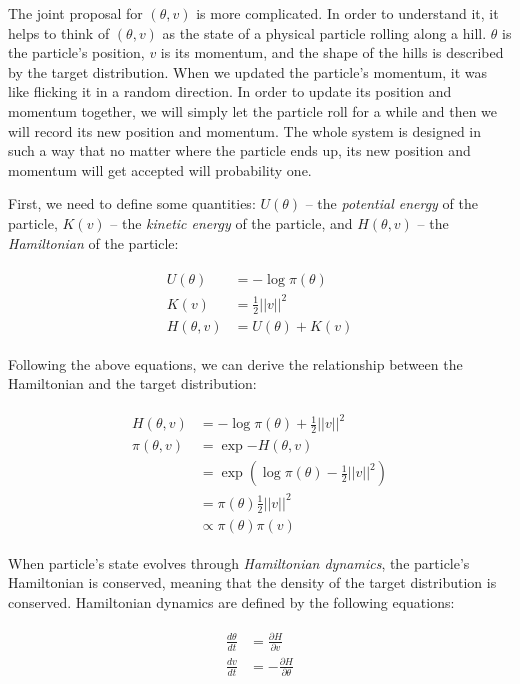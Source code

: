 \documentclass[12pt]{article}
\begin{document}
{The joint proposal for $(\theta, v)$ is more complicated. In order to understand it, it helps to think of $(\theta, v)$ as the state of a physical particle rolling along a hill. $\theta$ is the particle's position, $v$ is its momentum, and the shape of the hills is described by the target distribution. When we updated the particle's momentum, it was like flicking it in a random direction. In order to update its position and momentum together, we will simply let the particle roll for a while and then we will record its new position and momentum. The whole system is designed in such a way that no matter where the particle ends up, its new position and momentum will get accepted will probability one.

First, we need to define some quantities: $U(\theta)$ -- the \textit{potential energy} of the particle, $K(v)$ -- the \textit{kinetic energy} of the particle, and $H(\theta, v)$ -- the \textit{Hamiltonian} of the particle:

\begin{align}
\begin{split}
U(\theta) &= -\log \pi(\theta) \\
K(v) &= \frac{1}{2} ||v||^2 \\
H(\theta, v) &= U(\theta) + K(v)
\end{split}
\label{eq_hamiltonian}
\end{align}

Following the above equations, we can derive the relationship between the Hamiltonian and the target distribution:

\begin{align}
\begin{split}
H(\theta, v) &= -\log \pi(\theta) + \frac{1}{2}||v||^2 \\
\pi(\theta, v) &= \exp {-H(\theta, v)} \\
&= \exp \left(\log \pi(\theta) - \frac{1}{2}||v||^2 \right) \\
&= \pi(\theta) \frac{1}{2}||v||^2 \\
&\propto \pi(\theta) \pi(v)
\end{split}
\end{align}

When particle's state evolves through \textit{Hamiltonian dynamics}, the particle's Hamiltonian is conserved, meaning that the density of the target distribution is conserved. Hamiltonian dynamics are defined by the following equations:

\begin{align}
\begin{split}
\frac{d\theta}{dt} &= \frac{\partial H}{\partial v} \\
\frac{dv}{dt} &= -\frac{\partial H}{\partial \theta}
\end{split}
\label{eq_ham_dynamics}
\end{align}

}
\end{document}
